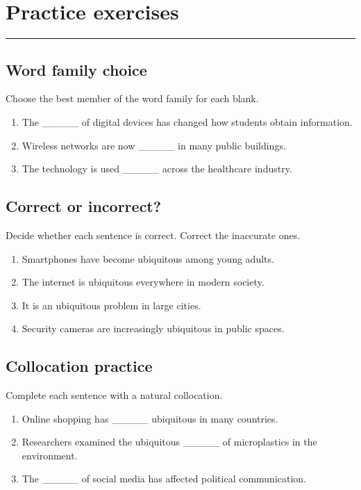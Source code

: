\documentclass[11pt]{article}
\newcommand{\sectionrule}{\par\vspace{-0.5em}\noindent\textcolor{Accent}{\rule{\linewidth}{0.6pt}}\par}
\begin{document}
\section{Practice exercises}
\sectionrule
\subsection{Word family choice}
Choose the best member of the word family for each blank.

\begin{enumerate}
  \item The \_\_\_\_\_ of digital devices has changed how students obtain information.
  \item Wireless networks are now \_\_\_\_\_ in many public buildings.
  \item The technology is used \_\_\_\_\_ across the healthcare industry.
\end{enumerate}

\subsection{Correct or incorrect?}
Decide whether each sentence is correct. Correct the inaccurate ones.

\begin{enumerate}
  \item Smartphones have become ubiquitous among young adults.
  \item The internet is ubiquitous everywhere in modern society.
  \item It is an ubiquitous problem in large cities.
  \item Security cameras are increasingly ubiquitous in public spaces.
\end{enumerate}

\subsection{Collocation practice}
Complete each sentence with a natural collocation.

\begin{enumerate}
  \item Online shopping has \_\_\_\_\_ ubiquitous in many countries.
  \item Researchers examined the ubiquitous \_\_\_\_\_ of microplastics in the environment.
  \item The \_\_\_\_\_ of social media has affected political communication.
\end{enumerate}
\end{document}
